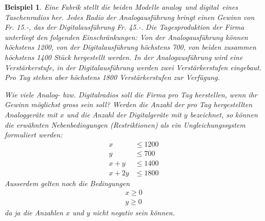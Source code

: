 \documentclass[%
11pt,%
twoside,%
titlepage,%
swissgerman,%
headsepline%
]{scrartcl}
\theoremstyle{definition}
\newtheorem{bsp}{Beispiel}[subsection] %
\theoremstyle{plain}
\newtheorem{bsp}{Beispiel}[subsection] %
\theoremstyle{plain}
\begin{document}
		\begin{bsp}
			Eine Fabrik stellt die beiden Modelle \glqq analog\grqq\ und \glqq digital\grqq\ eines Taschenradios her. Jedes Radio der Analogausführung bringt einen Gewinn von Fr. 15.-, das der Digitalausführung Fr. 45.-.
			Die Tagesproduktion der Firma unterliegt den folgenden Einschränkungen: Von der Analogausführung können höchstens 1200, von der Digitalausführung höchstens 700, von beiden zusammen höchstens 1400 Stück hergestellt werden. In der Analogausführung wird eine Verstärkerstufe, in der Digitalausführung werden zwei Verstärkerstufen eingebaut. Pro Tag stehen aber höchstens 1800 Verstärkerstufen zur Verfügung.
			
			Wie viele Analog- bzw. Digitalradios soll die Firma pro Tag herstellen, wenn ihr Gewinn möglichst gross sein soll?
			Werden die Anzahl der pro Tag hergestellten Analoggeräte mit $x$ und die Anzahl der Digitalgeräte mit $y$ bezeichnet, so können die erwähnten Nebenbedingungen (Restriktionen) als ein Ungleichungssystem formuliert werden:
			\begin{align}
				x&\leq1200\\
				y&\leq700\\
				x+y&\leq1400\\
				x+2y&\leq1800
			\end{align}
			Ausserdem gelten noch die Bedingungen
			\begin{align*}
				x\geq0\\
				y\geq0
			\end{align*}
			da ja die Anzahlen $x$ und $y$ nicht negativ sein können.
			

\end{bsp}
\end{document}
